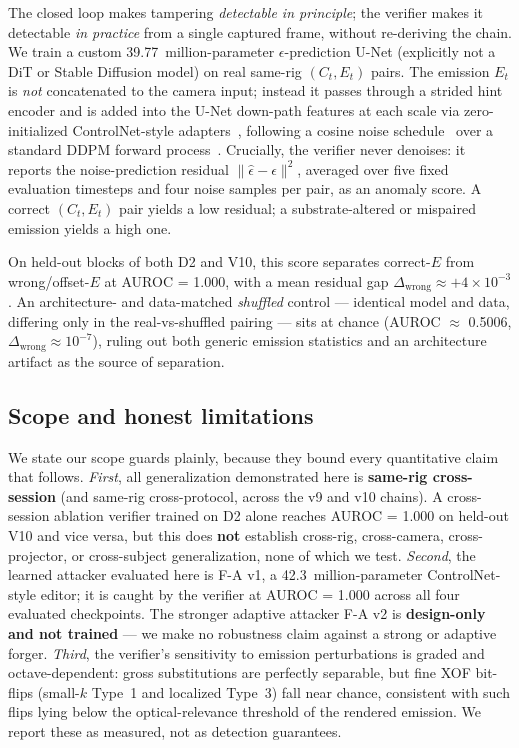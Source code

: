 The closed loop makes tampering \emph{detectable in principle}; the verifier makes it detectable \emph{in practice} from a single captured frame, without re-deriving the chain. We train a custom \num{39.77}~million-parameter $\epsilon$-prediction U-Net (explicitly not a DiT or Stable Diffusion model) on real same-rig $(C_t, E_t)$ pairs. The emission $E_t$ is \emph{not} concatenated to the camera input; instead it passes through a strided hint encoder and is added into the U-Net down-path features at each scale via zero-initialized ControlNet-style adapters~\cite{zhang2023controlnet}, following a cosine noise schedule~\cite{nicholdhariwal2021} over a standard DDPM forward process~\cite{ho2020ddpm}. Crucially, the verifier never denoises: it reports the noise-prediction residual $\lVert \hat{\epsilon}-\epsilon\rVert^2$, averaged over five fixed evaluation timesteps and four noise samples per pair, as an anomaly score. A correct $(C_t, E_t)$ pair yields a low residual; a substrate-altered or mispaired emission yields a high one.

On held-out blocks of both D2 and V10, this score separates correct-$E$ from wrong/offset-$E$ at AUROC = 1.000, with a mean residual gap $\Delta_{\text{wrong}} \approx +4 \times 10^{-3}$. An architecture- and data-matched \emph{shuffled} control --- identical model and data, differing only in the real-vs-shuffled pairing --- sits at chance (AUROC $\approx$ 0.5006, $\Delta_{\text{wrong}} \approx 10^{-7}$), ruling out both generic emission statistics and an architecture artifact as the source of separation.

\subsection{Scope and honest limitations}

We state our scope guards plainly, because they bound every quantitative claim that follows. \emph{First}, all generalization demonstrated here is \textbf{same-rig cross-session} (and same-rig cross-protocol, across the v9 and v10 chains). A cross-session ablation verifier trained on D2 alone reaches AUROC = 1.000 on held-out V10 and vice versa, but this does \textbf{not} establish cross-rig, cross-camera, cross-projector, or cross-subject generalization, none of which we test. \emph{Second}, the learned attacker evaluated here is F-A v1, a \num{42.3}~million-parameter ControlNet-style editor; it is caught by the verifier at AUROC = 1.000 across all four evaluated checkpoints. The stronger adaptive attacker F-A v2 is \textbf{design-only and not trained} --- we make no robustness claim against a strong or adaptive forger. \emph{Third}, the verifier's sensitivity to emission perturbations is graded and octave-dependent: gross substitutions are perfectly separable, but fine XOF bit-flips (small-$k$ Type~1 and localized Type~3) fall near chance, consistent with such flips lying below the optical-relevance threshold of the rendered emission. We report these as measured, not as detection guarantees.

